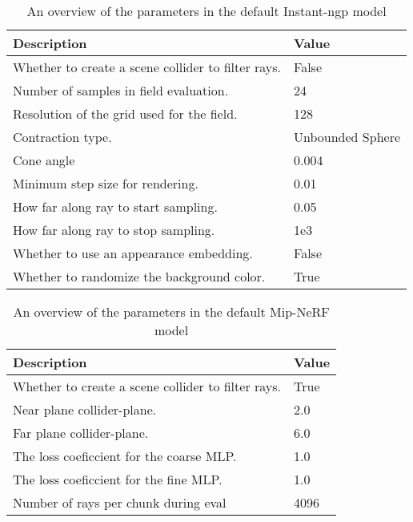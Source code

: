 \begin{table}[ht]
    \centering
    \begin{tabularx}{\textwidth}{|X|l|}
    \hline
    \textbf{Description} & \textbf{Value} \\ 
    \hline
    Whether to create a scene collider to filter rays. & False \\
    Number of samples in field evaluation. & 24 \\
    Resolution of the grid used for the field. & 128 \\
    Contraction type. & Unbounded Sphere \\
    Cone angle & 0.004 \\
    Minimum step size for rendering. & 0.01 \\
    How far along ray to start sampling. & 0.05 \\
    How far along ray to stop sampling. & 1e3 \\
    Whether to use an appearance embedding. & False \\
    Whether to randomize the background color. & True \\ \hline
    \end{tabularx}
    \caption{An overview of the parameters in the default Instant-ngp model}
    \label{tab:instant-ngp-parameter-overview}
\end{table}

\begin{table}[ht]
    \centering
    \begin{tabularx}{\textwidth}{|X|l|}
    \hline
    \textbf{Description} & \textbf{Value} \\ 
    \hline
    Whether to create a scene collider to filter rays.  & True \\
    Near plane collider-plane.                          & 2.0 \\
    Far plane collider-plane.                           & 6.0 \\
    The loss coeficcient for the coarse MLP.            & 1.0 \\
    The loss coeficcient for the fine MLP.              & 1.0 \\
    Number of rays per chunk during eval                & 4096 \\
    \hline
    \end{tabularx}
    \caption{An overview of the parameters in the default Mip-NeRF model}
    \label{tab:mip-nerf-parameter-overview}
\end{table}


